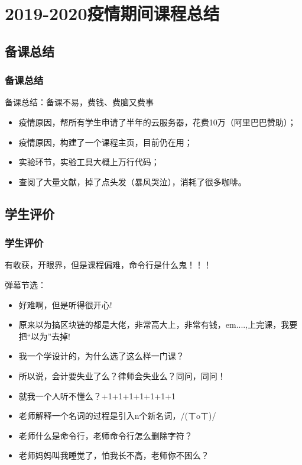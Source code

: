 \documentclass[11pt]{beamer}
\begin{document}
\begin{frame}
\begin{figure}
{\begin{minipage}[ht]{0.35\linewidth}
				\label{fig:teacher}
			\end{minipage}%
		}%
	\end{figure}

\end{frame}


\section{2019-2020疫情期间课程总结}
\subsection{备课总结}
\begin{frame}
	\frametitle{备课总结}
	备课总结：备课不易，费钱、费脑又费事~
	\begin{itemize}
		\item 疫情原因，帮所有学生申请了半年的云服务器，花费10万（阿里巴巴赞助）；
		\item 疫情原因，构建了一个课程主页，目前仍在用；
		\item 实验环节，实验工具大概上万行代码；
		\item 查阅了大量文献，掉了点头发（暴风哭泣），消耗了很多咖啡。
	\end{itemize}
\end{frame}
\subsection{学生评价}
\begin{frame}
	\frametitle{学生评价}
	有收获，开眼界，但是课程偏难，命令行是什么鬼！！！

	弹幕节选：
	\begin{itemize}
		\item 好难啊，但是听得很开心!
		\item 原来以为搞区块链的都是大佬，非常高大上，非常有钱，em....,上完课，我要把“以为”去掉!
		\item 我一个学设计的，为什么选了这么样一门课？
		\item 所以说，会计要失业了么？律师会失业么？同问，同问！
		\item 就我一个人听不懂么？+1+1+1+1+1+1+1
		\item 老师解释一个名词的过程是引入n个新名词，/(ㄒoㄒ)/~~
		\item 老师什么是命令行，老师命令行怎么删除字符？
		\item 老师妈妈叫我睡觉了，怕我长不高，老师你不困么？
	\end{itemize}
\end{frame}
\end{document}
